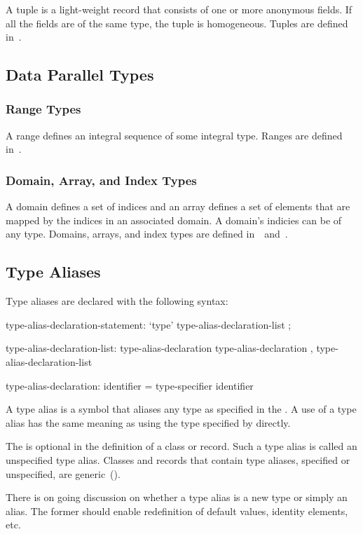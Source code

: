 A tuple is a light-weight record that consists of one or more
anonymous fields.  If all the fields are of the same type, the tuple
is homogeneous.  Tuples are defined in~.

\subsection{Data Parallel Types}
\label{Data_Parallel_Types}

\subsubsection{Range Types}

A range defines an integral sequence of some integral type.  Ranges
are defined in~.

\subsubsection{Domain, Array, and Index Types}
\label{Domain_and_Array_Types}

A domain defines a set of indices and an array defines a set of
elements that are mapped by the indices in an associated domain.  A
domain's indicies can be of any type.  Domains, arrays, and index
types are defined in~~and~.

\subsection{Type Aliases}
\label{Type_Aliases}

Type aliases are declared with the following syntax:
\begin{syntax}
type-alias-declaration-statement:
  `type' type-alias-declaration-list ;

type-alias-declaration-list:
  type-alias-declaration
  type-alias-declaration , type-alias-declaration-list

type-alias-declaration:
  identifier = type-specifier
  identifier
\end{syntax}
A type alias is a symbol that aliases any type as specified in the
.  A use of a type alias has the same meaning as using
the type specified by  directly.

The  is optional in the definition of a class or
record.  Such a type alias is called an unspecified type
alias. Classes and records that contain type aliases, specified or
unspecified, are generic~().

\begin{openissue}
There is on going discussion on whether a type alias is a new
type or simply an alias.  The former should enable redefinition of
default values, identity elements, etc.
\end{openissue}
